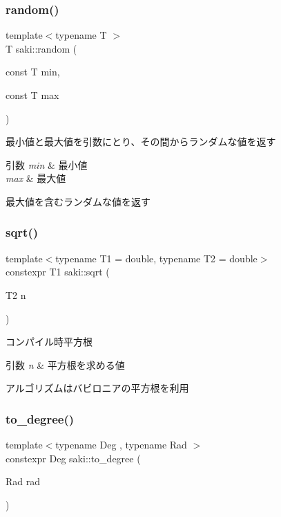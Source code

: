 \subsubsection{\texorpdfstring{random()}{random()}}
{\footnotesize\ttfamily template$<$typename T $>$ \\
T saki\+::random (\begin{DoxyParamCaption}\item[{const T}]{min,  }\item[{const T}]{max }\end{DoxyParamCaption})}



最小値と最大値を引数にとり、その間からランダムな値を返す 


\begin{DoxyParams}{引数}
{\em min} & 最小値 \\
\hline
{\em max} & 最大値\\
\hline
\end{DoxyParams}
最大値を含むランダムな値を返す \mbox{\label{namespacesaki_a1dd39b17c9f89c99717d452d9318eb83}} 
\subsubsection{\texorpdfstring{sqrt()}{sqrt()}}
{\footnotesize\ttfamily template$<$typename T1  = double, typename T2  = double$>$ \\
constexpr T1 saki\+::sqrt (\begin{DoxyParamCaption}\item[{T2}]{n }\end{DoxyParamCaption})}



コンパイル時平方根 


\begin{DoxyParams}{引数}
{\em n} & 平方根を求める値\\
\hline
\end{DoxyParams}
アルゴリズムはバビロニアの平方根を利用 \mbox{\label{namespacesaki_aa28ebe642bd2c0e608e2a61c34b3d7a5}} 
\subsubsection{\texorpdfstring{to\+\_\+degree()}{to\_degree()}}
{\footnotesize\ttfamily template$<$typename Deg , typename Rad $>$ \\
constexpr Deg saki\+::to\+\_\+degree (\begin{DoxyParamCaption}\item[{Rad}]{rad }\end{DoxyParamCaption})}



